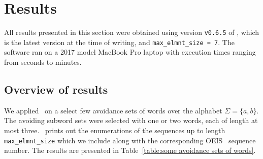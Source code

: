 \section{Results\label{words results}}

All results presented in this section were obtained using version \texttt{v0.6.5} 
of \CombCov, which is the latest version at the time of writing, and 
\texttt{max\_elmnt\_size = 7}. The software ran on a 2017 model MacBook Pro laptop 
with execution times ranging from seconds to minutes.


\subsection{Overview of results}

We applied \CombCov\ on a select few avoidance sets of words over the alphabet 
$\Sigma = \{a,b\}$. The avoiding subword sets were selected with one or two 
words, each of length at most three. \CombCov\ prints out the enumerations of 
the sequences up to length \texttt{max\_elmnt\_size} which we include along with 
the corresponding OEIS~\cite{oeis_foundation_inc._-line_2019} sequence number. 
The results are presented in Table~\ref{table:some avoidance sets of words}.

